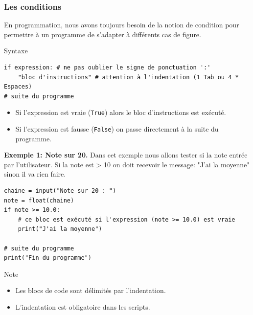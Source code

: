 \documentclass{beamer}
\begin{document}
\begin{frame}
\frametitle{Les conditions}


En programmation, nous avons toujours besoin de la notion de condition pour permettre à un programme de s'adapter à différents cas de figure.

\begin{block}{Syntaxe }

\begin{verbatim}
if expression: # ne pas oublier le signe de ponctuation ':'
    "bloc d'instructions" # attention à l'indentation (1 Tab ou 4 * Espaces)
# suite du programme
\end{verbatim}
\begin{itemize}
\item Si l'expression est vraie (\texttt{True}) alors le bloc d'instructions est exécuté.

\item Si l'expression est fausse (\texttt{False}) on passe directement à la suite du programme.
\end{itemize}

\noindent
\end{block}



\end{frame}

\begin{frame}

\noindent\textbf{Exemple 1: Note sur 20.}
Dans cet exemple nous allons tester si la note entrée par l'utilisateur. Si la note est > 10 on doit recevoir le message: "J'ai la moyenne" sinon il va rien faire.
\begin{verbatim}
chaine = input("Note sur 20 : ")
note = float(chaine)
if note >= 10.0:
    # ce bloc est exécuté si l'expression (note >= 10.0) est vraie
    print("J'ai la moyenne")

# suite du programme
print("Fin du programme")
\end{verbatim}

\begin{block}{Note}
\begin{itemize}
\item Les blocs de code sont délimités par l'indentation.

\item L'indentation est obligatoire dans les scripts.
\end{itemize}

\noindent
\end{block}
\end{frame}
\end{document}
